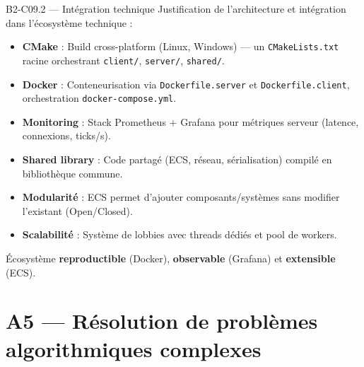 \documentclass[aspectratio=169,10pt]{beamer}
\begin{document}
\begin{frame}{B2-C09.2 — Intégration technique}
\footnotesize
Justification de l'architecture et intégration dans l'écosystème technique :

\begin{itemize}\setlength\itemsep{2pt}
  \item \textbf{CMake} : Build cross-platform (Linux, Windows) — un \texttt{CMakeLists.txt} racine orchestrant \texttt{client/}, \texttt{server/}, \texttt{shared/}.
  \item \textbf{Docker} : Conteneurisation via \texttt{Dockerfile.server} et \texttt{Dockerfile.client}, orchestration \texttt{docker-compose.yml}.
  \item \textbf{Monitoring} : Stack Prometheus + Grafana pour métriques serveur (latence, connexions, ticks/s).
  \item \textbf{Shared library} : Code partagé (ECS, réseau, sérialisation) compilé en bibliothèque commune.
  \item \textbf{Modularité} : ECS permet d'ajouter composants/systèmes sans modifier l'existant (Open/Closed).
  \item \textbf{Scalabilité} : Système de lobbies avec threads dédiés et pool de workers.
\end{itemize}

\vspace{0.2em}
Écosystème \textbf{reproductible} (Docker), \textbf{observable} (Grafana) et \textbf{extensible} (ECS).
\end{frame}

\section{A5 — Résolution de problèmes algorithmiques complexes}
\end{document}
